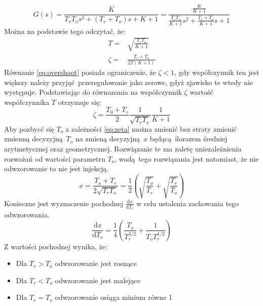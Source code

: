 \documentclass[a4paper, 12pt]{article}
\begin{document}
            $$
                G(s) = \frac{K}{T_rT_os^2 + (T_r + T_o)s + K + 1} =
                    \frac{\frac{K}{K+1}}{\frac{T_rT_o}{K + 1}s^2 + \frac{T_r + T_o} {K + 1} s + 1}
            $$
            Można na podstawie tego odczytać, że:
            $$
                \begin{aligned}
                    T =& \sqrt{\frac{T_rT_o}{K + 1}} \\
                    \zeta =& \frac{T_r + T_o}{2 T (K + 1)}
                \end{aligned}
            $$
            Równanie \ref{eq:overshoot}  posiada ograniczenie, że $\zeta < 1$, gdy współczynnik 
            ten jest większy należy przyjąć przeregulowanie jako zerowe, gdyż zjawisko te wtedy 
            nie występuje. Podstawiając do równanania na współczynnik $\zeta$ wartość współczynnika
            $T$ otrzymuje się:
            \begin{equation}
                \zeta = \frac{T_0 + T_r}{2} \frac{1}{\sqrt{T_rT_o}} \frac{1}{K + 1}
                \label{eq:zeta}
            \end{equation}
            Aby pozbycć się $T_o$ z zależności \ref{eq:zeta} można zmienić bez straty zmienić zmienną
            decyzyjną $T_o$ na zmieną decyzyjną $x$ będącą ilorazem średniej arytmetycznej oraz 
            geometrycznej. Rozwiązanie te ma zaletę uniezależnienia rozważań od wartości parametru
            $T_o$, wadą tego rozwiązania jest natomiast, że nie odwzorowanie to nie jest injekcją.
            $$
                x = \frac{T_o + T_r}{2\sqrt{T_rT_o}} = \frac{1}{2} 
                \left(
                    \sqrt{\frac{T_o}{T_r}} + \sqrt{\frac{T_r}{T_o}}
                \right)
            $$
            Konieczne jest wyznaczenie pochodnej $\frac{\mathrm{d}x}{\mathrm{d}T_r}$ w celu ustalenia
            zachowania tego odwzorowania.
            $$
                \frac{\mathrm{d}x}{\mathrm{d}T_r} = \frac{1}{4} \left(
                    \frac{T_o}{T_r^{3/2}} +
                    \frac{1}{T_o T_r^{1/2}}
                \right)
            $$
            Z wartości pochodnej wynika, że:
            \begin{itemize}
                \item Dla $T_r > T_o$ odwzorowanie jest rosnące
                \item Dla $T_r < T_o$ odwzorowanie jest malejące
                \item Dla $T_r = T_o$ odwzorowanie osiąga minium równe 1
            \end{itemize}
\end{document}

